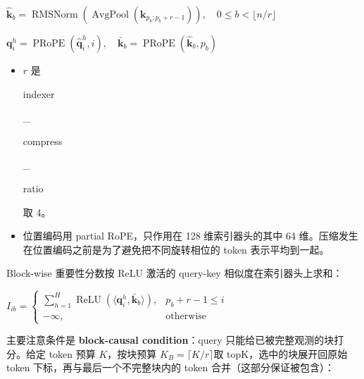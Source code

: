 \documentclass[zihao=false,fontset=windows]{ctexart}
\newcommand{\bigmath}[1]{%
  \begin{center}\large$\displaystyle #1$\end{center}%
}
\begin{document}
\bigmath{\widehat{\mathbf k}_b=\operatorname{RMSNorm}(\operatorname{AvgPool}(\mathbf k_{p_b:p_b+r-1})),\quad0\le b<\lfloor n/r\rfloor}
\bigmath{\mathbf q_i^h=\operatorname{PRoPE}(\widehat{\mathbf q}_i^h,i),\quad\bar{\mathbf k}_b=\operatorname{PRoPE}(\widehat{\mathbf k}_b,p_b)}
\begin{itemize}
\item $r$ 是 {\setlength{\fboxsep}{0pt}\colorbox{inlinebg}{\strut\ttfamily indexer}\colorbox{inlinebg}{\strut\ttfamily \_}\allowbreak{}\colorbox{inlinebg}{\strut\ttfamily compress}\colorbox{inlinebg}{\strut\ttfamily \_}\allowbreak{}\colorbox{inlinebg}{\strut\ttfamily ratio}} 取 4。
\item 位置编码用 partial RoPE，只作用在 128 维索引器头的其中 64 维。压缩发生在位置编码之前是为了避免把不同旋转相位的 token 表示平均到一起。
\end{itemize}
\par\vspace{0.75em}\par\vspace{0.28em}
Block-wise 重要性分数按 ReLU 激活的 query-key 相似度在索引器头上求和：

\bigmath{I_{ib}=\begin{cases}\sum_{h=1}^{H}\operatorname{ReLU}(\langle\mathbf q_i^h,\bar{\mathbf k}_b\rangle),&p_b+r-1\le i\\-\infty,&\text{otherwise}\end{cases}}
主要注意条件是\textbf{ }\textcolor{feishuRed}{\textbf{block-causal condition}}：query 只能给已被完整观测的块打分。给定 token 预算 $K$，按块预算 $K_B=\lceil K/r\rceil$取 topK，选中的块展开回原始 token 下标，再与最后一个不完整块内的 token 合并（这部分保证被包含）：
\end{document}
